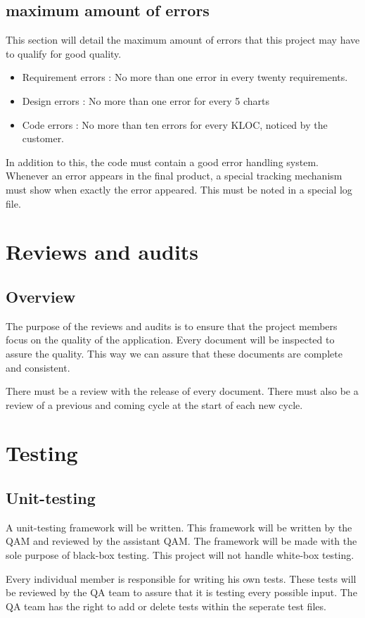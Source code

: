\documentclass[salesmen, twoside]{softproj}
\begin{document}
\begin{projdoc}
\section{maximum amount of errors}
This section will detail the maximum amount of errors that this project may have to qualify for good quality.
\begin{itemize}
\item Requirement errors : No more than one error in every twenty requirements.
\item Design errors : No more than one error for every 5 charts
\item Code errors : No more than ten errors for every KLOC, noticed by the customer.
\end{itemize}
In addition to this, the code must contain a good error handling system. Whenever an error appears in the final product, a special tracking mechanism must show when exactly the error appeared. This must be noted in a special log file.

\chapter{Reviews and audits}
\section{Overview}
The purpose of the reviews and audits is to ensure that the project members focus on the quality of the application. Every document will be inspected to assure the quality. This way we can assure that these documents are complete and consistent.

There must be a review with the release of every document. There must also be a review of a previous and coming cycle at the start of each new cycle.

\chapter{Testing}
\section{Unit-testing}
A unit-testing framework will be written. This framework will be written by the QAM and reviewed by the assistant QAM. The framework will be made with the sole purpose of black-box testing. This project will not handle white-box testing.

Every individual member is responsible for writing his own tests. These tests will be reviewed by the QA team to assure that it is testing every possible input. The QA team has the right to add or delete tests within the seperate test files.


\end{projdoc}
\end{document}
